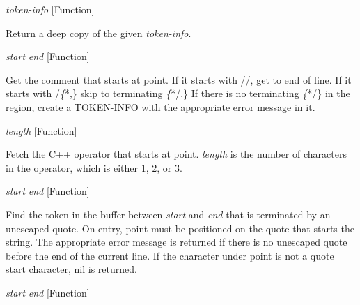 \vspace{1em}
\noindent
{}
\usebox{\funcname}\emph{token-info}
 \hfill [Function]

\begin{doc-string}
Return a deep copy of the given \emph{token-info}.
\end{doc-string}

\vspace{1em}
\noindent
{}
\usebox{\funcname}\emph{start} \emph{end}
 \hfill [Function]

\begin{doc-string}
Get the comment that starts at point.  If it starts with //, get to end of
line.  If it starts with /\emph\{*,\} skip to terminating \emph\{*/.\}  If there is no terminating
\emph\{*/\} in the region, create a TOKEN-INFO with the appropriate error message in it.
\end{doc-string}

\vspace{1em}
\noindent
{}
\usebox{\funcname}\emph{length}
 \hfill [Function]

\begin{doc-string}
Fetch the C++ operator that starts at point.  \emph{length} is the number of characters
in the operator, which is either 1, 2, or 3.
\end{doc-string}

\vspace{1em}
\noindent
{}
\usebox{\funcname}\emph{start} \emph{end}
 \hfill [Function]

\begin{doc-string}
Find the token in the buffer between \emph{start} and \emph{end} that is terminated by an
unescaped quote.  On entry, point must be positioned on the quote that starts
the string.  The appropriate error message is returned if there is no unescaped
quote before the end of the current line.  If the character under point is not a
quote start character, nil is returned.
\end{doc-string}

\vspace{1em}
\noindent
{}
\usebox{\funcname}\emph{start} \emph{end}
 \hfill [Function]

